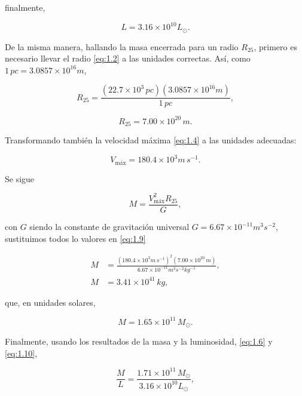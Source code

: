 \documentclass[paper=a4, fontsize=10pt]{scrartcl} %
\begin{document}
finalmente, 

\begin{equation} \label{eq:1.6}
L = 3.16 \times 10^{10}  L_{\odot}. 
\end{equation}

De la misma manera, hallando la masa encerrada para un radio $R_{25}$, primero es necesario llevar el radio \eqref{eq:1.2} a las unidades correctas. Así, como $1 \, pc= 3.0857 \times 10^{16} m$,

$$ R_{25} = \frac{(22. 7 \times 10^3 \, pc)(3.0857 \times 10^{16} m)}{1 \, pc},$$

\begin{equation} \label{eq:1.7}
R_{25} = 7.00 \times 10^{20} \, m. 
\end{equation}

Transformando también la velocidad máxima \eqref{eq:1.4} a las unidades adecuadas: 

\begin{equation} \label{eq:1.8}
V_{\text{máx}} = 180.4 \times 10^3 m\, s^{-1}.
\end{equation}

Se sigue 

\begin{equation} \label{eq:1.9}
M = \frac{V_{\text{máx}}^2 R_{25}}{G}, 
\end{equation}
 
 con $G$ siendo la constante de gravitación universal $G = 6.67 \times 10^{-11} m^3 s^{-2}$, sustituimos todos lo valores en \eqref{eq:1.9} 
 
\begin{align*}
 M & = \frac{(180.4 \times 10^3 m \, s^{-1})^2 (7.00 \times 10^{20} \, m)}{6.67 \times 10^{-11} m^3 s^{-2} kg^{-1}}, \\
M & = 3.41 \times 10^{41} \,kg,
\end{align*}

que, en unidades solares,

\begin{equation} \label{eq:1.10}
M = 1.65 \times 10^{11} \, M_{\odot}.
\end{equation}
\vspace{0.3cm} 

Finalmente, usando los resultados de la masa y la luminosidad, \eqref{eq:1.6} y \eqref{eq:1.10}, 

\begin{equation*} 
\frac{M}{L} = \frac{1.71\times 10^{11} \, M_{\odot}}{3.16 \times 10^{10}  L_{\odot}},
\end{equation*}
\end{document}
